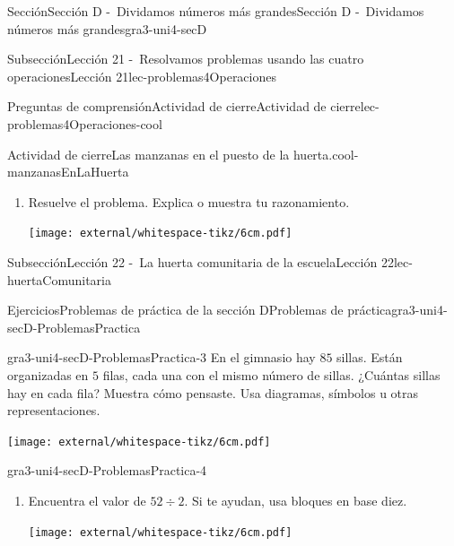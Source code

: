 \begin{sectionptx}{Sección}{Sección D -~Dividamos números más grandes}{}{Sección D -~Dividamos números más grandes}{}{}{gra3-uni4-secD}
\begin{subsectionptx}{Subsección}{Lección 21 -~Resolvamos problemas usando las cuatro operaciones}{}{Lección 21}{}{}{lec-problemas4Operaciones}
\begin{reading-questions-subsubsection}{Preguntas de comprensión}{Actividad de cierre}{}{Actividad de cierre}{}{}{lec-problemas4Operaciones-cool}
\begin{project}{Actividad de cierre}{Las manzanas en el puesto de la huerta.}{cool-manzanasEnLaHuerta}
\begin{enumerate}[label={(\alph*)}]
\begin{image}{0}{1}{0}{}%
\texttt{[image: external/whitespace-tikz/1cm.pdf]}
\end{image}%
\item{}Resuelve el problema. Explica o muestra tu razonamiento.%
\begin{image}{0}{1}{0}{}%
\texttt{[image: external/whitespace-tikz/6cm.pdf]}
\end{image}%
\end{enumerate}
\end{project}%
\end{reading-questions-subsubsection}
\end{subsectionptx}
%
%
\typeout{************************************************}
\typeout{************************************************}
%
\begin{subsectionptx}{Subsección}{Lección 22 -~La huerta comunitaria de la escuela}{}{Lección 22}{}{}{lec-huertaComunitaria}
\end{subsectionptx}
%
%
\typeout{************************************************}
\typeout{************************************************}
%
\begin{exercises-subsection}{Ejercicios}{Problemas de práctica de la sección D}{}{Problemas de práctica}{}{}{gra3-uni4-secD-ProblemasPractica}
\begin{divisionexercise}{1}{}{}{gra3-uni4-secD-ProblemasPractica-3}%
En el gimnasio hay \(85\) sillas. Están organizadas en \(5\) filas, cada una con el mismo número de sillas. ¿Cuántas sillas hay en cada fila? Muestra cómo pensaste. Usa diagramas, símbolos u otras representaciones.%
\begin{image}{0}{1}{0}{}%
\texttt{[image: external/whitespace-tikz/6cm.pdf]}
\end{image}%
\end{divisionexercise}%
\vspace{2cm}
\begin{divisionexercise}{2}{}{}{gra3-uni4-secD-ProblemasPractica-4}%
%
\vspace{-1.35\baselineskip}
\begin{enumerate}[label={(\alph*)}]
\item{}Encuentra el valor de \(52 \div 2\). Si te ayudan, usa bloques en base diez.%
\begin{image}{0}{1}{0}{}%
\texttt{[image: external/whitespace-tikz/6cm.pdf]}
\end{image}%

\end{enumerate}
\end{divisionexercise}
\end{exercises-subsection}
\end{sectionptx}
